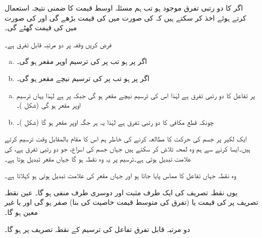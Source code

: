 اگر  کا دو رتبی تفرق موجود ہو تب ہم مسئلہ اوسط قیمت کا ضمنی نتیجہ  استعمال کرتے ہوئے اخذ کر سکتے ہیں کہ  کی صورت میں  کی قیمت بڑھے گی اور  کی صورت میں  کی قیمت گھٹے گی۔ 


فرض کریں وقفہ  پر  دو مرتبہ قابل تفرق ہے۔
\begin{enumerate}[a.]
\item
اگر  پر  ہو تب  پر  کی ترسیم اوپر مقعر ہو گی۔
\item
اگر  پر  ہو تب  پر  کی ترسیم نیچے مقعر ہو گی۔
\end{enumerate}

\begin{enumerate}[a.]
\item
{} پر تفاعل  کا دو رتبی تفرق  ہے  لہٰذا اس کی ترسیم نیچے مقعر ہو گی جبکہ  پر  ہے لہٰذا یہاں ترسیم اوپر مقعر ہو گی (شکل )۔
\item
چونکہ قطع مکافی  کا دو رتبی تفرق  ہے لہٰذا یہ ہر جگہ اوپر مقعر ہو گا (شکل )۔ 
\end{enumerate}
ایک لکیر پر جسم کی حرکت کا مطالعہ کرنے کی خاطر ہم اس کا مقام بالمقابل وقت ترسیم کرتے ہیں۔ایسا کرنے سے ہم وہ لمحہ تلاش کر سکتے  ہیں جہاں جسم کی اسراع، جو دو رتبی تفرق ہے، کی علامت تبدیل ہوتی ہے۔ترسیم پر یہ وہ نقطہ ہو گا جہاں مقعر تبدیل ہوتا ہے۔

وہ نقطہ جہاں تفاعل کا مماس پایا جاتا ہو اور جہاں مقعر کی علامت تبدیل ہوتی ہو  کہلاتا ہے۔

یوں نقطہ تصریف کی ایک طرف  مثبت اور دوسری طرف منفی ہو گا۔ عین نقطہ تصریف پر  کی قیمت یا (تفرق کی متوسط قیمت خاصیت کی بنا) صفر ہو گی  اور یا  غیر معین ہو گا۔

دو مرتبہ قابل تفرق تفاعل کی ترسیم کے نقطہ تصریف پر  ہو گا۔

